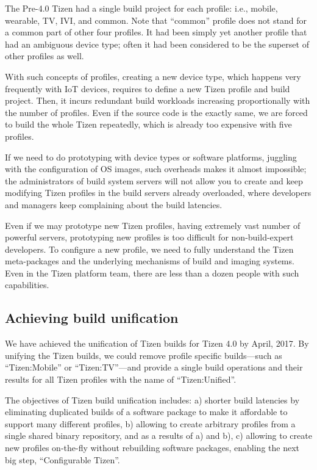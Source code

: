 The Pre-4.0 Tizen had a single build project for each profile: i.e., mobile, wearable, TV, IVI, and common. Note that “common” profile does not stand for a common part of other four profiles. It had been simply yet another profile that had an ambiguous device type; often it had been considered to be the superset of other profiles as well.


With such concepts of profiles, creating a new device type, which happens very frequently with IoT devices, requires to define a new Tizen profile and build project. Then, it incurs redundant build workloads increasing proportionally with the number of profiles. Even if the source code is the exactly same, we are forced to build the whole Tizen repeatedly, which is already too expensive with five profiles.


If we need to do prototyping with device types or software platforms, juggling with the configuration of OS images, such overheads makes it almost impossible; the administrators of build system servers will not allow you to create and keep modifying Tizen profiles in the build servers already overloaded, where developers and managers keep complaining about the build latencies.


Even if we may prototype new Tizen profiles, having extremely vast number of powerful servers, prototyping new profiles is too difficult for non-build-expert developers. To configure a new profile, we need to fully understand the Tizen meta-packages and the underlying mechanisms of build and imaging systems. Even in the Tizen platform team, there are less than a dozen people with such capabilities.


\subsection{Achieving build unification}\label{S_ach_build_unif}

We have achieved the unification of Tizen builds for Tizen 4.0 by April, 2017. By unifying the Tizen builds, we could remove profile specific builds—such as “Tizen:Mobile” or “Tizen:TV”—and provide a single build operations and their results for all Tizen profiles with the name of  “Tizen:Unified”.


The objectives of Tizen build unification includes: a) shorter build latencies by eliminating duplicated builds of a software package to make it affordable to support many different profiles, b) allowing to create arbitrary profiles from a single shared binary repository, and as a results of a) and b), c) allowing to create new profiles on-the-fly without rebuilding software packages, enabling the next big step, “Configurable Tizen”.


